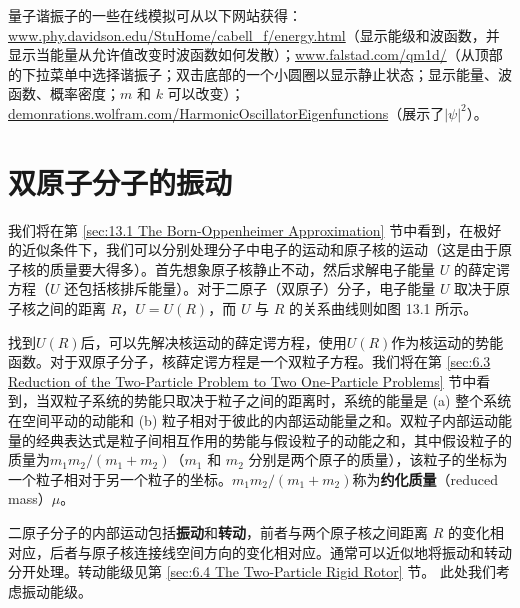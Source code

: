     量子谐振子的一些在线模拟可从以下网站获得：\url{www.phy.davidson.edu/StuHome/cabell_f/energy.html}（显示能级和波函数，并显示当能量从允许值改变时波函数如何发散）；\url{www.falstad.com/qm1d/}（从顶部的下拉菜单中选择谐振子；双击底部的一个小圆圈以显示静止状态；显示能量、波函数、概率密度；$m$ 和 $k$ 可以改变）；\url{demonrations.wolfram.com/HarmonicOscillatorEigenfunctions}（展示了$\left|\psi\right|^2$）。

\section{双原子分子的振动}
\label{sec:4.3 Vibrations of Diatomic Molecules}
    我们将在第 \ref{sec:13.1 The Born-Oppenheimer Approximation} 节中看到，在极好的近似条件下，我们可以分别处理分子中电子的运动和原子核的运动（这是由于原子核的质量要大得多）。首先想象原子核静止不动，然后求解电子能量 $U$ 的薛定谔方程（$U$ 还包括核排斥能量）。对于二原子（双原子）分子，电子能量 $U$ 取决于原子核之间的距离 $R$，$U=U\left(R\right)$，而 $U$ 与 $R$ 的关系曲线则如图 13.1 所示。

    找到$U\left(R\right)$后，可以先解决核运动的薛定谔方程，使用$U\left(R\right)$作为核运动的势能函数。对于双原子分子，核薛定谔方程是一个双粒子方程。我们将在第 \ref{sec:6.3 Reduction of the Two-Particle Problem to Two One-Particle Problems} 节中看到，当双粒子系统的势能只取决于粒子之间的距离时，系统的能量是 (a) 整个系统在空间平动的动能和 (b) 粒子相对于彼此的内部运动能量之和。双粒子内部运动能量的经典表达式是粒子间相互作用的势能与假设粒子的动能之和，其中假设粒子的质量为$m_1m_2/\left(m_1+m_2\right)$（$m_1$ 和 $m_2$ 分别是两个原子的质量），该粒子的坐标为一个粒子相对于另一个粒子的坐标。$m_1m_2/\left(m_1+m_2\right)$称为\textbf{约化质量}（reduced mass）$\mu$。

    二原子分子的内部运动包括\textbf{振动}和\textbf{转动}，前者与两个原子核之间距离 $R$ 的变化相对应，后者与原子核连接线空间方向的变化相对应。通常可以近似地将振动和转动分开处理。转动能级见第 \ref{sec:6.4 The Two-Particle Rigid Rotor} 节。 此处我们考虑振动能级。

